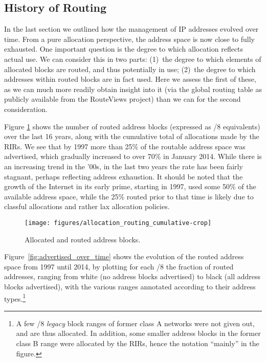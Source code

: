 \documentclass[letter]{sigcomm-alternate}
\begin{document}
\subsection{History of Routing}

In the last section we outlined how the management of IP addresses evolved over
time. From a pure allocation perspective, the address space is now close
to fully 
exhausted.  One important question is the degree to which
allocation reflects actual use.  We can consider this in two parts: (1)~the
degree to which elements of allocated blocks are routed, and thus potentially
in use; (2)~the degree to which addresses within routed blocks are in fact
used.  Here we assess the first of these, as we can much more readily obtain
insight into it (via the global routing table as publicly available from the
RouteViews project) than we can for the second consideration.

Figure \ref{fig:advertised_over_time_aggregate} shows the number of routed 
address blocks (expressed as /8 equivalents) over the last 16 years, along with 
the cumulative total of allocations made by the RIRs. We see that by 1997 
more than 25\% of the routable address space was advertised, which gradually 
increased to over 70\% in January 2014. While there is an increasing trend in 
the '00s, in the last two years the rate has been fairly stagnant,
perhaps reflecting address exhaustion. It should be noted  that the growth 
of the Internet in its early prime, starting in 1997,
used some 50\% of the available address space, while the 25\% routed prior
to that time
is likely due to classful allocations and rather lax allocation policies.

\begin{figure} \centering
\texttt{[image: figures/allocation\_routing\_cumulative-crop]}
\caption{Allocated and routed address blocks.}
 \vspace{-1em}
\label{fig:advertised_over_time_aggregate} 
\end{figure}


Figure~\ref{fig:advertised_over_time} shows the evolution of the routed address
space from 1997 until 2014, by plotting for each /8 the fraction of routed
addresses, ranging from white (no address blocks advertised) to black (all
address blocks advertised), with the various ranges annotated according to
their address types.\footnote{
	A few /8 \emph{legacy} block ranges of former class A networks
	were not given out, and are thus allocated.  In addition,
	some smaller address blocks in the former class B range were
	allocated by the RIRs, hence the notation ``mainly'' in the figure.}
\end{document}
